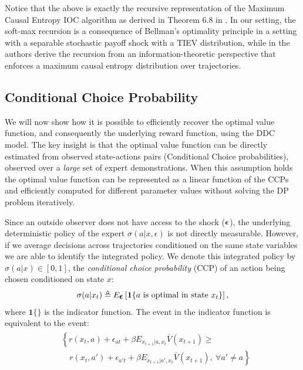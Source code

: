 \documentclass{article}
\renewcommand{\vec}[1]{\mbox{\bm{$#1$}}}
\begin{document}

Notice that the above is exactly the recursive representation of the Maximum Causal Entropy IOC algorithm as derived in Theorem 6.8 in \cite{ziebart_phd}. In our setting, the soft-max recursion is a consequence of Bellman's optimality principle in a setting with a separable stochastic payoff shock with a TIEV distribution, while in \cite{ziebart_phd} the authors derive the recursion from an information-theoretic perspective that enforces a maximum causal entropy distribution over trajectories.

\subsection{Conditional Choice Probability}

We will now show how it is possible to efficiently recover the optimal value function, and consequently the underlying reward function, using the DDC model. The key insight is that the optimal value function can be directly estimated from observed state-actions pairs (Conditional Choice probabilities), observed over a \textit{large} set of expert demonstrations. When this assumption holds the optimal value function can be represented as a linear function of the CCPs and efficiently computed for different parameter values without solving the DP problem iteratively.

Since an outside observer does not have access to the shock ($\vec{\epsilon}$), the underlying deterministic policy of the expert $\sigma(a | x,\epsilon)$ is not directly measurable. However, if we average decisions across trajectories conditioned on the same state variables we are able to identify the integrated policy. We denote this integrated policy by $\sigma(a|x)\in[0,1]$, the \emph{conditional choice probability} (CCP) of an action being chosen conditioned on state $x$: 
\begin{eqnarray}
\sigma(a|x_t)\triangleq E_{\vec{\epsilon}}\left[ \mathbf{1}\{a\ \textrm{is optimal in state }x_t\}\right],
\end{eqnarray}
where $\mathbf{1}\{\}$ is the indicator function. The event in the indicator function is equivalent to the event:
\begin{align}
\begin{split}
& \left\{r(x_t,a)+\epsilon_{at}+\beta E_{x_{t+1}|a,x_t} \overline{V}(x_{t+1})\geq \right. \\
& \quad \left. r(x_t,a')+\epsilon_{a't}+\beta E_{x_{t+1}|a',x_t} \overline{V}(x_{t+1}),\ \forall a'\neq a \right\}
\end{split}
\end{align}
\end{document}
